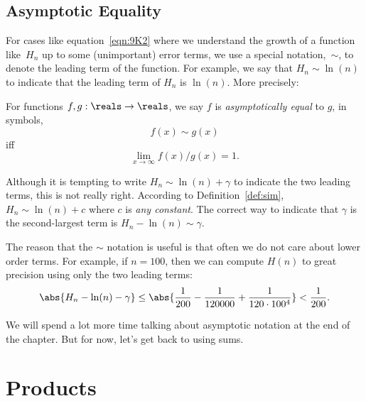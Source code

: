 \subsection{Asymptotic Equality}\label{sec:asymptotic_equality}

For cases like equation~\ref{eqn:9K2} where we understand the growth
of a function like~$H_n$ up to some (unimportant) error terms, we use
a special notation,~$\sim$, to denote the leading term of the
function.  For example, we say that $H_n \sim \ln(n)$ to indicate that
the leading term of $H_n$ is $\ln(n)$.  More precisely:
\begin{definition}\label{def:sim}
  For functions $f,g: \reals \to \reals$, we say $f$ is%
\emph{asymptotically equal} to $g$, in symbols,
\[
f(x) \sim g(x)
\]
iff
\[
\lim_{x \rightarrow \infty} f(x)/g(x) = 1.
\]
\end{definition}

Although it is tempting to write $H_n \sim \ln(n) + \gamma$ to indicate
the two leading terms, this is not really right.  According to
Definition~\ref{def:sim}, $H_n \sim \ln(n) + c$ where $c$ is \emph{any
  constant}.  The correct way to indicate that $\gamma$ is the
second-largest term is $H_n - \ln(n) \sim \gamma$.

The reason that the $\sim$ notation is useful is that often we do not care
about lower order terms.  For example, if $n = 100$, then we can compute
$H(n)$ to great precision using only the two leading terms:
\[
\abs{H_n - \ln(n) - \gamma} \leq \abs{\frac{1}{200} - \frac{1}{120000} +
\frac{1}{120 \cdot 100^4}} < \frac{1}{200}.
\]

We will spend a lot more time talking about asymptotic notation at the
end of the chapter.  But for now, let's get back to using sums.

\begin{problems}
\classproblems
{}

\homeworkproblems
{}
\begin{editingnotes}
\end{editingnotes}

\examproblems
{}

\end{problems}

\section{Products}\label{sec:closed_products}

